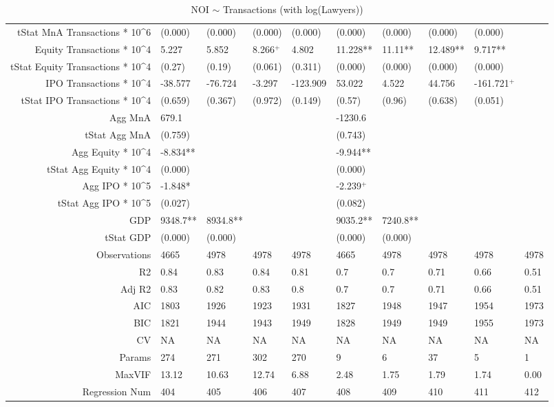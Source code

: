 \begin{table}[ht]
\begin{tabular}{rlllllllll}
  tStat MnA Transactions * 10^6 & (0.000) & (0.000) & (0.000) & (0.000) & (0.000) & (0.000) & (0.000) & (0.000) &  \\ 
  Equity Transactions * 10^4 & 5.227 & 5.852 & 8.266$^{+}$ & 4.802 & 11.228** & 11.11** & 12.489** & 9.717** &  \\ 
  tStat Equity Transactions * 10^4 & (0.27) & (0.19) & (0.061) & (0.311) & (0.000) & (0.000) & (0.000) & (0.000) &  \\ 
  IPO Transactions * 10^4 & -38.577 & -76.724 & -3.297 & -123.909 & 53.022 & 4.522 & 44.756 & -161.721$^{+}$ &  \\ 
  tStat IPO Transactions * 10^4 & (0.659) & (0.367) & (0.972) & (0.149) & (0.57) & (0.96) & (0.638) & (0.051) &  \\ 
  Agg MnA & 679.1 &  &  &  & -1230.6 &  &  &  &  \\ 
  tStat Agg MnA & (0.759) &  &  &  & (0.743) &  &  &  &  \\ 
  Agg Equity * 10^4 & -8.834** &  &  &  & -9.944** &  &  &  &  \\ 
  tStat Agg Equity * 10^4 & (0.000) &  &  &  & (0.000) &  &  &  &  \\ 
  Agg IPO * 10^5 & -1.848* &  &  &  & -2.239$^{+}$ &  &  &  &  \\ 
  tStat Agg IPO * 10^5 & (0.027) &  &  &  & (0.082) &  &  &  &  \\ 
  GDP & 9348.7** & 8934.8** &  &  & 9035.2** & 7240.8** &  &  &  \\ 
  tStat GDP & (0.000) & (0.000) &  &  & (0.000) & (0.000) &  &  &  \\ 
  Observations & 4665 & 4978 & 4978 & 4978 & 4665 & 4978 & 4978 & 4978 & 4978 \\ 
  R2 & 0.84 & 0.83 & 0.84 & 0.81 & 0.7 & 0.7 & 0.71 & 0.66 & 0.51 \\ 
  Adj R2 & 0.83 & 0.82 & 0.83 & 0.8 & 0.7 & 0.7 & 0.71 & 0.66 & 0.51 \\ 
  AIC & 1803 & 1926 & 1923 & 1931 & 1827 & 1948 & 1947 & 1954 & 1973 \\ 
  BIC & 1821 & 1944 & 1943 & 1949 & 1828 & 1949 & 1949 & 1955 & 1973 \\ 
  CV & NA & NA & NA & NA & NA & NA & NA & NA & NA \\ 
  Params & 274 & 271 & 302 & 270 & 9 & 6 & 37 & 5 & 1 \\ 
  MaxVIF & 13.12 & 10.63 & 12.74 & 6.88 & 2.48 & 1.75 & 1.79 & 1.74 & 0.00 \\ 
  Regression Num & 404 & 405 & 406 & 407 & 408 & 409 & 410 & 411 & 412 \\ 
   \hline
\end{tabular}
\caption{NOI $\sim$ Transactions (with log(Lawyers))} 
\end{table}
